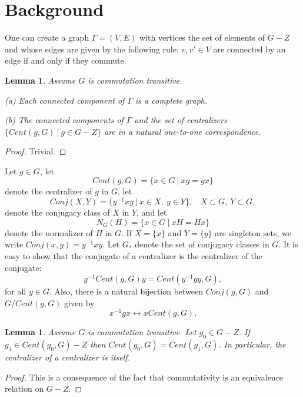 \documentclass[amsfonts,12pt]{article}
\newtheorem{lemma}[theorem]{Lemma}
\begin{document}
\section{Background}

 One can create a graph $\Gamma = (V,E)$ with vertices 
  the set of elements of $G-Z$ and whose edges are given by 
  the following rule: $v,v' \in V$ are connected by an edge
  if and only if they commute. 

\begin{lemma} Assume $G$ is commutation transitive. 

  (a) Each connected component of $\Gamma$ is a complete
  graph. 

  (b) The connected components of $\Gamma$ and the set of centralizers
$\{Cent(g,G)\ |\ g\in G-Z\}$ are in a natural one-to-one correspondence.
\end{lemma}

\begin{proof} Trivial. \end{proof}


    Let $g \in G$, let
\[
         Cent(g,G) = \{ x \in G\ |\ xg = gx\}
\]
denote the centralizer of $g$ in $G$, let
\[
         Conj(X,Y) = \{ y^{-1}xy\ |\ x\in X,\ y\in Y\},
\ \ \ \ X\subset G,\ Y\subset G,
\]
denote the conjugacy class of $X$ in $Y$, and let
\[
        N_G(H) = \{ x \in G\ |\ xH = Hx\}
\]
denote the normalizer of $H$ in $G$. If $X=\{x\}$ and 
$Y=\{y\}$ are singleton sets, we write $Conj(x,y)=y^{-1}xy$.
Let $G_*$ denote the set
of conjugacy classes in $G$. It is easy to show that
the conjugate of a centralizer is the centralizer of the 
conjugate:
\begin{equation}
         y^{-1}Cent(g,G)y = Cent(y^{-1}gy,G),
\label{eq:*}
\end{equation}
for all $y \in G$. Also, there is a natural bijection
between $Conj(g,G)$ and $G/Cent(g,G)$ given by 
\[
  x^{-1}gx  \longleftrightarrow xCent(g,G).
\]
  
\begin{lemma} Assume $G$ is commutation transitive. Let 
$g_0\in G-Z$. If $g_1\in Cent(g_0,G)-Z$ then 
$Cent(g_0,G)=Cent(g_1,G)$. In
particular, the centralizer of a centralizer is itself.
\label{lemma:cent}
\end{lemma}

\begin{proof} This is a consequence of the fact that commutativity
is an equivalence relation on $G-Z$.   
\end{proof}
\end{document}
